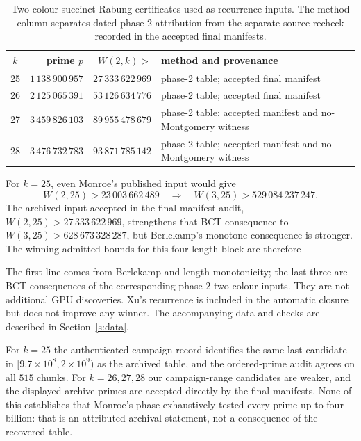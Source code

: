 \begin{table}[htbp]
\centering\small
\begin{tabular}{@{}c r r P{6.1cm}@{}}
\toprule
$k$ & prime $p$ & $W(2,k)>$ & method and provenance \\
 & $1\,138\,900\,957$ & $27\,333\,622\,969$ & phase-2 table; accepted final manifest \\
26 & $2\,125\,065\,391$ & $53\,126\,634\,776$ & phase-2 table; accepted final manifest \\
27 & $3\,459\,826\,103$ & $89\,955\,478\,679$ & phase-2 table; accepted manifest and no-Montgomery witness \\
28 & $3\,476\,732\,783$ & $93\,871\,785\,142$ & phase-2 table; accepted manifest and no-Montgomery witness \\
\bottomrule
\end{tabular}
\caption{Two-colour succinct Rabung certificates used as recurrence inputs.
The method column separates dated phase-2 attribution from the separate-source
recheck recorded in the accepted final manifests.}
\label{tab:r2}
\end{table}

For $k=25$, even Monroe's published input would give
\[
  W(2,25)>23\,003\,662\,489
  \quad\Longrightarrow\quad
  W(3,25)>529\,084\,237\,247.
\]
The archived input accepted in the final manifest audit,
$W(2,25)>27\,333\,622\,969$, strengthens that BCT consequence to
$W(3,25)>628\,673\,328\,287$, but Berlekamp's monotone consequence is stronger.
The winning admitted bounds for this four-length block are therefore



The first line comes from Berlekamp and length monotonicity; the last three are
BCT consequences of the corresponding phase-2 two-colour inputs. They are not
additional GPU discoveries. Xu's recurrence is included in the automatic
closure but does not improve any winner. The accompanying data and checks are described in Section~\ref{s:data}.

For $k=25$ the authenticated campaign record identifies the same last
candidate in $[9.7\times10^8,2\times10^9)$ as the archived table, and the
ordered-prime audit agrees on all $515$ chunks.  For $k=26,27,28$
our campaign-range candidates are weaker, and the displayed archive primes
are accepted directly by the final manifests.  None of this establishes
that Monroe's phase exhaustively tested every prime up to four billion: that is
an attributed archival statement, not a consequence of the recovered table.

